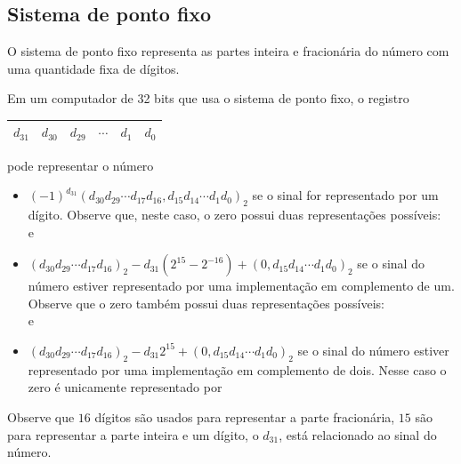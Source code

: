 \subsection{Sistema de ponto fixo}

O sistema de ponto fixo representa as partes inteira e fracionária do número com uma quantidade fixa de dígitos.

\begin{ex}
Em um computador de 32 bits que usa o sistema de ponto fixo, o registro
\begin{center}
  \begin{tabular}{|c|c|c|c|c|c|} \hline
    $d_{31}$ & $d_{30}$ & $d_{29}$ & $\cdots$ & $d_1$ & $d_0$\\\hline
  \end{tabular}
\end{center}
pode representar o número
\begin{itemize}
\item $(-1)^{d_{31}}(d_{30}d_{29}\cdots d_{17}d_{16}, d_{15}d_{14}\cdots d_1d_0)_2$
se o sinal for representado por um dígito. Observe que, neste caso, o zero possui duas representações possíveis:
\begin{equation}
  [10000000000000000000000000000000]
\end{equation}
e
\begin{equation}
  [00000000000000000000000000000000]
\end{equation}
\item $(d_{30}d_{29}\cdots d_{17}d_{16})_2-d_{31}(2^{15}-2^{-16})+(0,d_{15}d_{14}\cdots d_1d_0)_2$
se o sinal do número estiver representado por uma implementação em complemento de um. Observe que o zero também possui duas representações possíveis:
\begin{equation}
  [11111111111111111111111111111111]
\end{equation}
e
\begin{equation}
  [00000000000000000000000000000000]
\end{equation}
\item $(d_{30}d_{29}\cdots d_{17}d_{16})_2-d_{31}2^{15}+(0,d_{15}d_{14}\cdots d_1d_0)_2$
se o sinal do número estiver representado por uma implementação em complemento de dois. Nesse caso o zero é unicamente representado por
\begin{equation}
  [00000000000000000000000000000000]
\end{equation}
\end{itemize}
Observe que $16$ dígitos são usados para representar a parte fracionária, $15$ são para representar a parte inteira e um dígito, o $d_{31}$, está relacionado ao sinal do número.
\end{ex}

